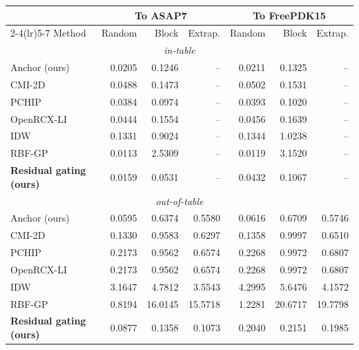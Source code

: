 \small
\begin{tabular}{lrrrrrr}\toprule
&\multicolumn{3}{c}{To ASAP7}&\multicolumn{3}{c}{To FreePDK15} \\
\cmidrule(lr){2-4}\cmidrule(lr){5-7}
Method&Random&Block&Extrap.&Random&Block&Extrap. \\
\multicolumn{7}{c}{\emph{in-table}} \\\midrule
Anchor (ours) & 0.0205 & 0.1246 & -- & 0.0211 & 0.1325 & -- \\
CMI-2D & 0.0488 & 0.1473 & -- & 0.0502 & 0.1531 & -- \\
PCHIP & 0.0384 & 0.0974 & -- & 0.0393 & 0.1020 & -- \\
OpenRCX-LI & 0.0444 & 0.1554 & -- & 0.0456 & 0.1639 & -- \\
IDW & 0.1331 & 0.9024 & -- & 0.1344 & 1.0238 & -- \\
RBF-GP & 0.0113 & 2.5309 & -- & 0.0119 & 3.1520 & -- \\
\textbf{Residual gating (ours)} & 0.0159 & 0.0531 & -- & 0.0432 & 0.1067 & -- \\
\midrule\multicolumn{7}{c}{\emph{out-of-table}} \\\midrule
Anchor (ours) & 0.0595 & 0.6374 & 0.5580 & 0.0616 & 0.6709 & 0.5746 \\
CMI-2D & 0.1330 & 0.9583 & 0.6297 & 0.1358 & 0.9997 & 0.6510 \\
PCHIP & 0.2173 & 0.9562 & 0.6574 & 0.2268 & 0.9972 & 0.6807 \\
OpenRCX-LI & 0.2173 & 0.9562 & 0.6574 & 0.2268 & 0.9972 & 0.6807 \\
IDW & 3.1647 & 4.7812 & 3.5543 & 4.2995 & 5.6476 & 4.1572 \\
RBF-GP & 0.8194 & 16.0145 & 15.5718 & 1.2281 & 20.6717 & 19.7798 \\
\textbf{Residual gating (ours)} & 0.0877 & 0.1358 & 0.1073 & 0.2040 & 0.2151 & 0.1985 \\
\bottomrule\end{tabular}
